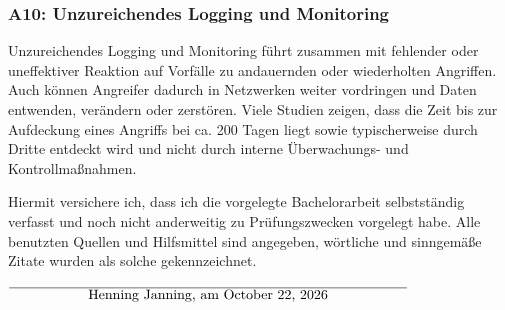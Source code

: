 \documentclass[12pt,oneside,a4paper,parskip]{scrbook}
\def\BaAuthor{Henning Janning}
\begin{document}
    \subsubsection{A10: Unzureichendes Logging und Monitoring}
    Unzureichendes Logging und Monitoring führt zusammen mit fehlender oder uneffektiver Reaktion auf Vorfälle zu andauernden oder wiederholten Angriffen. Auch können Angreifer dadurch in Netzwerken weiter vordringen und Daten entwenden, verändern oder zerstören. Viele Studien zeigen, dass die Zeit bis zur Aufdeckung eines Angriffs bei ca. 200 Tagen liegt sowie typischerweise durch Dritte entdeckt wird und nicht durch interne Überwachungs- und Kontrollmaßnahmen.




Hiermit versichere ich, dass ich die vorgelegte Bachelorarbeit selbstständig verfasst und noch nicht anderweitig zu Prüfungszwecken vorgelegt habe. Alle benutzten Quellen und Hilfsmittel sind angegeben, wörtliche und sinngemäße Zitate wurden als solche gekennzeichnet.

\vspace{20pt}
\begin{flushright}
$\overline{~~~~~~~~~~~~~~~~~\mbox{\BaAuthor, am \today}~~~~~~~~~~~~~~~~~}$
\end{flushright}
\end{document}
